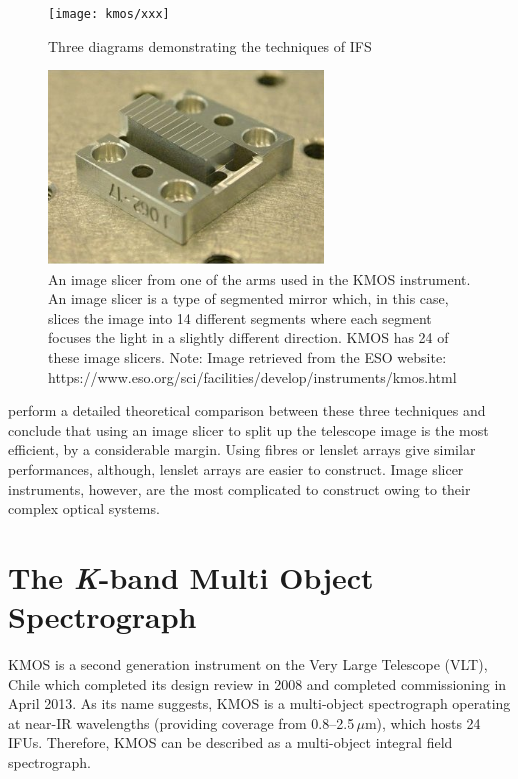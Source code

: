 \begin{figure}
 \centering
 \texttt{[image: kmos/xxx]}
 \caption[Integral Field Spectrosopic methods]{Three diagrams demonstrating the techniques of IFS
 \label{fig:IFS}}
\end{figure}

\begin{figure}
 \centering
 \includegraphics[width=0.65\textwidth]{kmos/kmos-image-slicer}
 \caption[The KMOS image slicer]{An image slicer from one of the arms used in the KMOS instrument.
 An image slicer is a type of segmented mirror which, in this case, slices the image into 14 different segments where each segment focuses the light in a slightly different direction.
 KMOS has 24 of these image slicers.
 Note: Image retrieved from the ESO website: https://www.eso.org/sci/facilities/develop/instruments/kmos.html
 \label{fig:image_slicer}}
\end{figure}


\cite{2006NewAR..50..244A} perform a detailed theoretical comparison between these three techniques and conclude that using an image slicer to split up the telescope image is the most efficient, by a considerable margin.
Using fibres or lenslet arrays give similar performances, although, lenslet arrays are easier to construct.
Image slicer instruments, however, are the most complicated to construct owing to their complex optical systems.





\section{The {\it K}-band Multi Object Spectrograph} %
\label{sec:KMOS}
KMOS is a second generation instrument on the Very Large Telescope (VLT), Chile which completed its design review in 2008 and completed commissioning in April 2013.
As its name suggests, KMOS is a multi-object spectrograph operating at near-IR wavelengths (providing coverage from 0.8--2.5\,$\mu$m), which hosts 24 IFUs.
Therefore, KMOS can be described as a multi-object integral field spectrograph.


